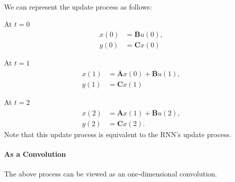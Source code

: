 We can represent the update process as follows:

At $t=0$
\begin{align*}
	x(0) &= \overline{\mathbf{B}}u(0),\\
	y(0) &= \mathbf{C}x(0)
\end{align*}

At $t=1$
\begin{align*}
	x(1) &= \overline{\mathbf{A}}x(0)+\overline{\mathbf{B}}u(1),\\
	y(1) &= \mathbf{C}x(1)
\end{align*}

At $t=2$
\begin{align*}
	x(2) &= \overline{\mathbf{A}}x(1)+\overline{\mathbf{B}}u(2),\\
	y(2) &= \mathbf{C}x(2).
\end{align*}
Note that this update process is equivalent to the RNN's update process. 

\paragraph{As a Convolution} 
The above process can be viewed as an one-dimensional convolution. 

